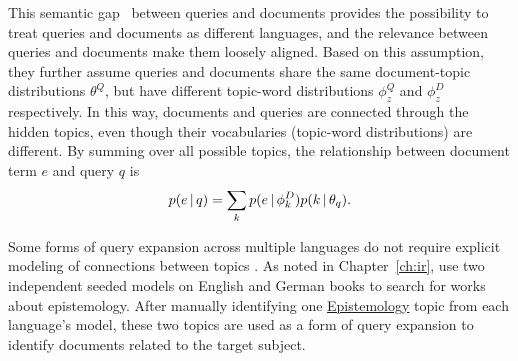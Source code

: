 This semantic gap~\citep{Muller-2009} between queries and documents
provides the possibility to treat queries and documents as different languages, and the relevance between
queries and documents make them loosely aligned. Based on this assumption, 
they further assume queries and documents share the same document-topic
distributions $\theta^Q$, but have different topic-word distributions
$\phi_z^Q$ and $\phi_z^D$ respectively.
In this way, documents and queries are
connected through the hidden topics, even though their vocabularies
(topic-word distributions) are different. By summing over all possible
topics, the relationship between document term $e$ and query $q$ is
\begin{align}
p(e \, | \, q) = \sum_k p(e \, | \, \phi_k^D) p(k \, | \, \theta_q).
\end{align}


Some forms of query expansion across multiple languages do not require
explicit modeling of connections between topics \citep{vulic2011crosslanguage,vulic2015probabilistic}.  As noted in
Chapter~\ref{ch:ir}, \citet{erlin2017topic} use two independent seeded
models on English and German books to search for works about
epistemology.  After manually identifying one \underline{Epistemology}
topic from each language's model, these two topics are used as a form
of query expansion to identify documents related to the target
subject.

